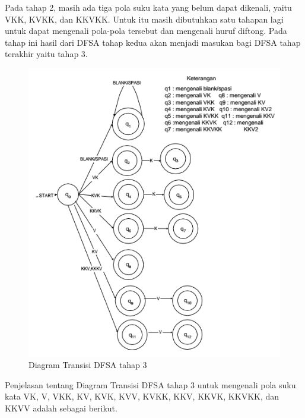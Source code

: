 Pada tahap 2, masih ada tiga pola suku kata yang belum dapat dikenali, yaitu VKK, KVKK, dan KKVKK. Untuk itu masih dibutuhkan satu tahapan lagi untuk dapat mengenali pola-pola tersebut dan mengenali huruf diftong. Pada tahap ini hasil dari DFSA tahap kedua akan menjadi masukan bagi DFSA tahap terakhir yaitu tahap 3.

\begin{figure}[H]
	\centering
	\includegraphics[scale=1.3]{Gambar/DFSA-3}
	\caption{Diagram Transisi DFSA tahap 3\cite{Thomas:2000}} 
	\label{fig:3-DFSA-3}
\end{figure}

Penjelasan tentang Diagram Transisi DFSA tahap 3 untuk mengenali pola suku kata VK, V, VKK, KV, KVK, KVV, KVKK, KKV, KKVK, KKVKK, dan KKVV adalah sebagai berikut.

